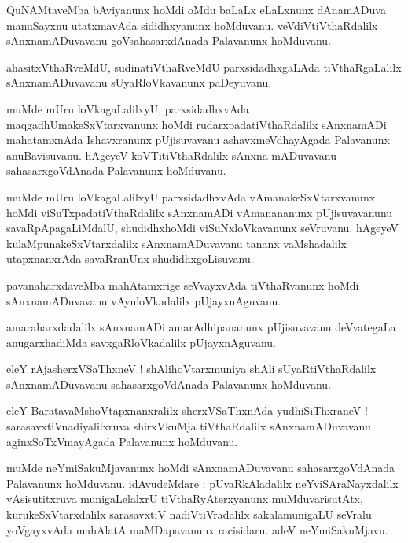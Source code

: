 \documentclass{article}
\begin{document}
\begin{mn}
QuNAMtaveMba bAviyanunx hoMdi oMdu baLaLx eLaLxnunx dAnamADuva manuSayxnu utatxmavAda 
sididhxyanunx hoMduvanu. veVdiVtiVthaRdalilx sAnxnamADuvavanu goVsahasarxdAnada Palavanunx 
hoMduvanu.
\end{mn}

\begin{mn}
ahasitxVthaRveMdU, sudinatiVthaRveMdU parxsidadhxgaLAda tiVthaRgaLalilx sAnxnamADuvavanu 
sUyaRloVkavanunx paDeyuvanu.
\end{mn}

\begin{mn}
muMde mUru loVkagaLalilxyU, parxsidadhxvAda maqgadhUmakeSxVtarxvanunx hoMdi rudarxpadatiVthaRdalilx 
sAnxnamADi mahatamxnAda Ishavxranunx pUjisuvavanu ashavxmeVdhayAgada Palavanunx anuBavisuvanu. 
hAgeyeV  koVTitiVthaRdalilx sAnxna mADuvavanu sahasarxgoVdAnada Palavanunx hoMduvanu.
\end{mn}

\begin{mn}
muMde mUru loVkagaLalilxyU parxsidadhxvAda vAmanakeSxVtarxvanunx hoMdi viSuTxpadatiVthaRdalilx 
sAnxnamADi vAmanananunx pUjisuvavanunu savaRpApagaLiMdalU, shudidhxhoMdi viSuNxloVkavanunx 
seVruvanu. hAgeyeV kulaMpunakeSxVtarxdalilx sAnxnamADuvavanu tananx vaMshadalilx utapxnanxrAda 
savaRranUnx shudidhxgoLisuvanu.
\end{mn}

\begin{mn}
pavanaharxdaveMba mahAtamxrige seVvayxvAda tiVthaRvanunx hoMdi sAnxnamADuvavanu vAyuloVkadalilx 
pUjayxnAguvanu.
\end{mn}

\begin{mn}
amaraharxdadalilx  sAnxnamADi amarAdhipananunx pUjisuvavanu deVvategaLa anugarxhadiMda 
savxgaRloVkadalilx pUjayxnAguvanu.
\end{mn}

\begin{mn}
eleY rAjasherxVSaThxneV ! shAlihoVtarxmuniya shAli sUyaRtiVthaRdalilx sAnxnamADuvavanu 
sahasarxgoVdAnada Palavanunx hoMduvanu.
\end{mn}

\begin{mn}
eleY BaratavaMshoVtapxnanxralilx sherxVSaThxnAda yudhiSiThxraneV ! sarasavxtiVnadiyalilxruva 
shirxVkuMja tiVthaRdalilx sAnxnamADuvavanu aginxSoTxVmayAgada Palavanunx hoMduvanu.
\end{mn}

\begin{mn}
muMde neYmiSakuMjavanunx hoMdi sAnxnamADuvavanu sahasarxgoVdAnada Palavanunx hoMduvanu. 
idAvudeMdare : pUvaRkAladalilx neYviSAraNayxdalilx vAsisutitxruva munigaLelalxrU 
tiVthaRyAterxyanunx muMduvarisutAtx, kurukeSxVtarxdalilx sarasavxtiV nadiVtiVradalilx 
sakalamunigaLU seVralu yoVgayxvAda mahAlatA maMDapavanunx  racisidaru. adeV neYmiSakuMjavu.
\end{mn}
\end{document}
